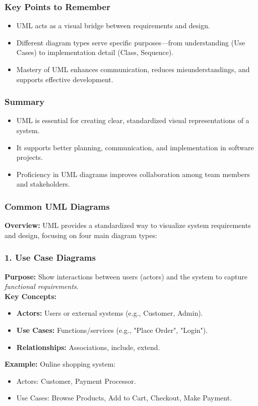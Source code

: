 \documentclass{beamer}
\begin{document}
\begin{frame}[fragile]
    \frametitle{Key Points to Remember}
    \begin{itemize}
        \item UML acts as a visual bridge between requirements and design.
        \item Different diagram types serve specific purposes—from understanding (Use Cases) to implementation detail (Class, Sequence).
        \item Mastery of UML enhances communication, reduces misunderstandings, and supports effective development.
    \end{itemize}
\end{frame}

\begin{frame}[fragile]
    \frametitle{Summary}
    \begin{itemize}
        \item UML is essential for creating clear, standardized visual representations of a system.
        \item It supports better planning, communication, and implementation in software projects.
        \item Proficiency in UML diagrams improves collaboration among team members and stakeholders.
    \end{itemize}
\end{frame}

\begin{frame}[fragile]
    \frametitle{Common UML Diagrams}
    \textbf{Overview:}  
    UML provides a standardized way to visualize system requirements and design, focusing on four main diagram types:
\end{frame}

\begin{frame}[fragile]
    \frametitle{1. Use Case Diagrams}
    \textbf{Purpose:} Show interactions between users (actors) and the system to capture \textit{functional requirements}. \\
    \textbf{Key Concepts:}
    \begin{itemize}
        \item \textbf{Actors:} Users or external systems (e.g., Customer, Admin).
        \item \textbf{Use Cases:} Functions/services (e.g., "Place Order", "Login").
        \item \textbf{Relationships:} Associations, include, extend.
    \end{itemize}
    \textbf{Example:} Online shopping system:
    \begin{itemize}
        \item Actors: Customer, Payment Processor.
        \item Use Cases: Browse Products, Add to Cart, Checkout, Make Payment.
    \end{itemize}
\end{frame}
\end{document}
